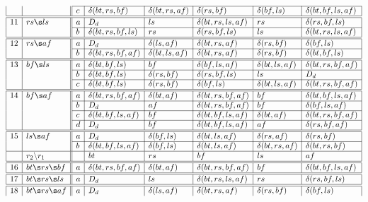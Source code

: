 \begin{table*}[!]
\[\begin{array}{|l|l||l|l|l|l|l|l|}
\cline{3-8} && c & \delta(bt,rs,bf) & \delta(bt,rs,af) & \delta(rs,bf) & \delta(bf,ls) & \delta(bt,bf,ls,af)\\
\hline\hline
11 & rs\s ls &
               a & D_d & ls & \delta(bt,rs,ls,af) & rs & \delta(rs,bf,ls)\\
\cline{3-8} && b & \delta(bt,rs,bf,ls) & rs & \delta(rs,bf,ls) & ls & \delta(bt,rs,ls,af)\\
\hline\hline
12 & rs\s af &
               a & D_d & \delta(ls,af)& \delta(bt,rs,af) & \delta(rs,bf)& \delta(bf,ls)\\
\cline{3-8} && b & \delta(bt,rs,bf,af) & \delta(bt,ls,af) & \delta(bt,rs,af) & \delta(rs,bf) & \delta(bt,bf,ls)\\
\hline\hline
13 & bf\s ls &
               a & \delta(bt,bf,ls) & bf & \delta(bf,ls,af) & \delta(bt,ls,af)& \delta(bt,rs,bf,af)\\
\cline{3-8} && b & \delta(bt,bf,ls) & \delta(rs,bf) & \delta(rs,bf,ls)& ls & D_d\\
\cline{3-8} && c & \delta(bt,bf,ls) & \delta(rs,bf) & \delta(bf,ls) & \delta(bt,ls,af) & \delta(bt,rs,bf,af)\\
\hline\hline
14 & bf\s af &
               a & \delta(bt,rs,bf,af) & \delta(bt,af) & \delta(bt,rs,bf,af) & bf & \delta(bt,bf,ls,af)\\
\cline{3-8} && b & D_d & af & \delta(bt,rs,bf,af) & bf & \delta(bf,ls,af)\\
\cline{3-8} && c & \delta(bt,bf,ls,af) & bf & \delta(bt,bf,ls,af) & \delta(bt,af) & \delta(bt,rs,bf,af)\\
\cline{3-8} && d & D_d & bf & \delta(bt,bf,ls,af) & af & \delta(rs,bf,af)\\
\hline\hline
15 & ls\s af &
               a & D_d & \delta(bf,ls) & \delta(bt,ls,af) & \delta(rs,af)& \delta(rs,bf)\\
\cline{3-8} && b & \delta(bt,bf,ls,af) & \delta(bf,ls) & \delta(bt,ls,af) & \delta(bt,rs,af) & \delta(bt,rs,bf)\\
\hline
& r_2\backslash r_1 &  & bt & rs & bf & ls & af \\\hline\hline
16 & bt\s rs\s bf &
               a & \delta(bt,rs,bf,af) & \delta(bt,af) & \delta(bt,rs,bf,af) & bf & \delta(bt,bf,ls,af)\\
\hline \hline
17 & bt\s rs\s ls &
              a & D_d & ls & \delta(bt,rs,ls,af) & rs & \delta(rs,bf,ls)\\
\hline \hline
18 & bt\s rs\s af &
               a & D_d & \delta(ls,af) & \delta(bt,rs,af) & \delta(rs,bf)& \delta(bf,ls)\\

\end{array}\]
\end{table*}
